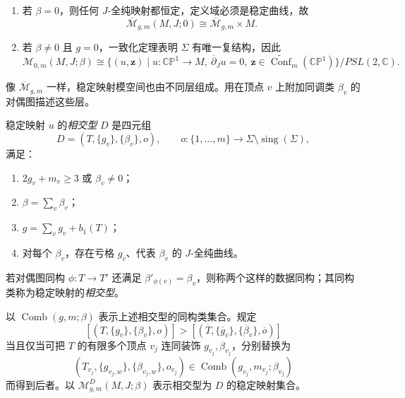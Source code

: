 \begin{example}\label{ex:special-stable-map-moduli}
\begin{enumerate}[label=(\arabic*)]
 \item 若 $\beta=0$，则任何 $J$-全纯映射都恒定，定义域必须是稳定曲线，故
 \[
  \overline{\mathcal M}_{g,m}(M,J;0)\cong
  \overline{\mathcal M}_{g,m}\times M.
 \]
 \item 若 $\beta\ne0$ 且 $g=0$，一致化定理表明 $\Sigma$ 有唯一复结构，因此
 \[
  \mathcal M_{0,m}(M,J;\beta)\cong
  \{(u,\boldsymbol z)\mid u:\mathbb{CP}^1\to M,
  \ \overline\partial_Ju=0,
  \ \boldsymbol z\in\widetilde{\operatorname{Conf}}_m(\mathbb{CP}^1)\}/PSL(2,\mathbb C).
 \]
\end{enumerate}
\end{example}

像 $\overline{\mathcal M}_{g,m}$ 一样，稳定映射模空间也由不同层组成。用在顶点 $v$ 上附加同调类
$\beta_v$ 的对偶图描述这些层。

\begin{definition}\label{def:intersection-pattern-stable-map}
稳定映射 $u$ 的\emph{相交型} $D$ 是四元组
\[
 D=(T,\{g_v\},\{\beta_v\},o),
 \qquad o:\{1,\ldots,m\}\to\Sigma\setminus\operatorname{sing}(\Sigma),
\]
满足：
\begin{enumerate}[label=(\arabic*)]
 \item $2g_v+m_v\ge3$ 或 $\beta_v\ne0$；
 \item $\beta=\sum_v\beta_v$；
 \item $g=\sum_vg_v+b_1(T)$；
 \item 对每个 $\beta_v$，存在亏格 $g_v$、代表 $\beta_v$ 的 $J$-全纯曲线。
\end{enumerate}
若对偶图同构 $\phi:T\to T'$ 还满足
$\beta'_{\phi(v)}=\beta_v$，则称两个这样的数据同构；其同构类称为稳定映射的\emph{相交型}。
\end{definition}

\begin{definition}\label{def:combinatorial-types-stable-maps}
以 $\operatorname{Comb}(g,m;\beta)$ 表示上述相交型的同构类集合。规定
\[
 [(T,\{g_v\},\{\beta_v\},o)]>
 [(\overline T,\{\overline g_v\},\{\overline\beta_v\},\overline o)]
\]
当且仅当可把 $T$ 的有限多个顶点 $v_j$ 连同装饰 $g_{v_j},\beta_{v_j}$，分别替换为
\[
 (T_{v_j},\{g_{v_j,w}\},\{\beta_{v_j,w}\},o_{v_j})
 \in\operatorname{Comb}(g_{v_j},m_{v_j};\beta_{v_j})
\]
而得到后者。以 $\mathcal M_{g,m}^D(M,J;\beta)$ 表示相交型为 $D$ 的稳定映射集合。
\end{definition}

